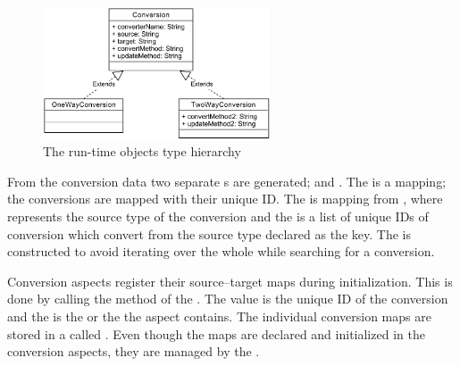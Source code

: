 \begin{figure}[h]
\centering
\includegraphics[width=0.6\textwidth]{chapteradapters/ConversionsUML.pdf}
\caption{The run-time  objects type hierarchy}
\label{fig:convclasses}
\end{figure}

From the conversion data two separate s are generated;  and .
The  is a  mapping; the conversions are mapped with their unique ID.  
The  is mapping from , where  represents the source type of the conversion and the  is a list of unique IDs of conversion which convert from the source type declared as the key. 
The  is constructed to avoid iterating over the whole  while searching for a conversion. 

Conversion aspects register their source--target maps during initialization.
This is done by calling the  method of the . The  value is the unique ID of the conversion and the  is the  or the  the aspect contains. 
The individual conversion maps are stored in a  called .
Even though the maps are declared and initialized in the conversion aspects, they are managed by the .

